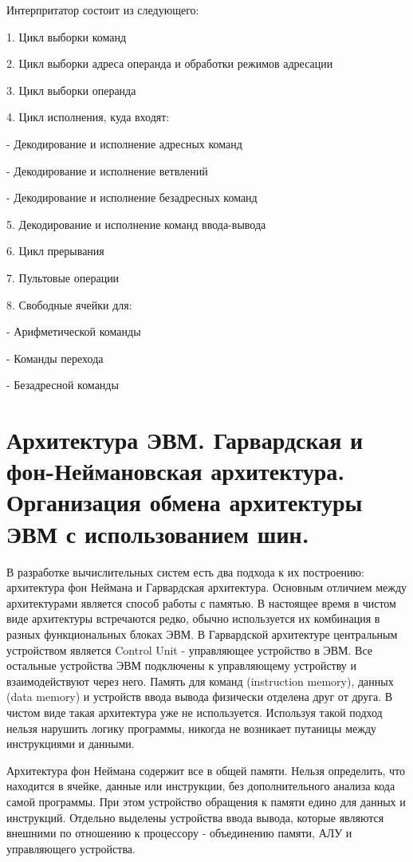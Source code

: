 \documentclass{article}
\begin{document}
Интерпритатор состоит из следующего:

1. Цикл выборки команд

2. Цикл выборки адреса операнда и обработки режимов адресации

3. Цикл выборки операнда

4. Цикл исполнения, куда входят:

- Декодирование и исполнение адресных команд

- Декодирование и исполнение ветвлений

- Декодирование и исполнение безадресных команд

5. Декодирование и исполнение команд ввода-вывода

6. Цикл прерывания

7. Пультовые операции

8. Свободные ячейки для:

- Арифметической команды

- Команды перехода

- Безадресной команды




\section{Архитектура ЭВМ. Гарвардская и фон-Неймановская архитектура. Организация обмена архитектуры ЭВМ с использованием шин.}

В разработке вычислительных систем есть два подхода к их построению: архитектура фон Неймана и Гарвардская архитектура.
Основным отличием между архитектурами является способ работы с памятью. В настоящее время в чистом виде архитектуры встречаются редко, 
обычно используется их комбинация в разных функциональных блоках ЭВМ.
В Гарвардской архитектуре центральным устройством является Control Unit - управляющее устройство в ЭВМ. 
Все остальные устройства ЭВМ подключены к управляющему устройству и взаимодействуют через него. 
Память для команд (instruction memory), данных (data memory) и устройств ввода вывода физически отделена друг от друга. 
В чистом виде такая архитектура уже не используется.
Используя такой подход нельзя нарушить логику программы, никогда не возникает путаницы между инструкциями и данными.


Архитектура фон Неймана содержит все в общей памяти. Нельзя определить, что находится в ячейке, данные или инструкции, без дополнительного анализа кода самой программы. 
При этом устройство обращения к памяти едино для данных и инструкций. 
Отдельно выделены устройства ввода вывода, которые являются внешними по отношению к процессору - объединению памяти, АЛУ и управляющего устройства.
\end{document}
